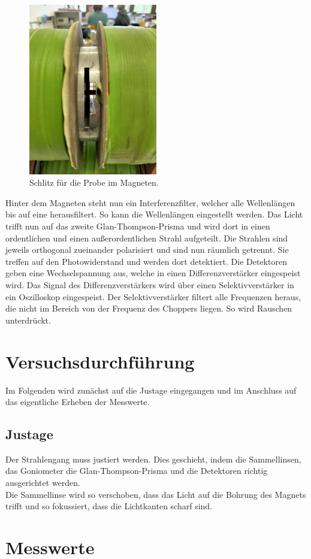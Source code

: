 \begin{figure}[H]
    \includegraphics[width=0.5\textwidth]{Schlitz.jpg}
    \caption{Schlitz für die Probe im Magneten.}
    \label{fig:Schlitz}
\end{figure}

\noindent Hinter dem Magneten steht nun ein Interferenzfilter, welcher alle Wellenlängen bis auf eine herausfiltert. So kann die 
Wellenlängen eingestellt werden. Das Licht trifft nun auf das zweite Glan-Thompson-Prisma und wird dort in einen ordentlichen und einen 
außerordentlichen Strahl aufgeteilt. Die Strahlen sind jeweils orthogonal zueinander polarisiert und sind nun räumlich getrennt. Sie 
treffen auf den Photowiderstand und werden dort detektiert. Die Detektoren geben eine Wechselspannung aus, welche in einen Differenzverstärker 
eingespeist wird. Das Signal des Differenzverstärkers wird über einen Selektivverstärker in ein Oszilloskop eingespeist. Der Selektivverstärker 
filtert alle Frequenzen heraus, die nicht im Bereich von der Frequenz des Choppers liegen. So wird Rauschen unterdrückt. 


\section{Versuchsdurchführung}
\noindent Im Folgenden wird zunächst auf die Justage eingegangen und im Anschluss auf das eigentliche Erheben der Messwerte.

\subsection{Justage}
\noindent Der Strahlengang muss justiert werden. Dies geschieht, indem die Sammellinsen, das Goniometer die Glan-Thompson-Prisma und 
die Detektoren richtig ausgerichtet werden. \\
Die Sammellinse wird so verschoben, dass das Licht auf die Bohrung des Magnets trifft und so fokussiert, dass die Lichtkanten scharf sind. 



\section{Messwerte}



